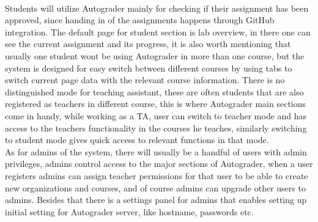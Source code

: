 \\Students will utilize Autograder mainly for checking if their assignment has been approved, since handing in of the assignments happens through GitHub integration. The default page for student section is lab overview, in there one can see the current assignment and its progress, it is also worth mentioning that usually one student wont be using Autograder in more than one course, but the system is designed for easy switch between different courses by using tabs to switch current page data with the relevant course information. There is no distinguished mode for teaching assistant, these are often students that are also registered as teachers in different course, this is where Autograder main sections come in handy, while working as a TA, user can switch to teacher mode and has access to the teachers functionality in the courses he teaches, similarly switching to student mode gives quick access to relevant functions in that mode.
\\As for admins of the system, there will usually be a handful of users with admin privileges, admins control access to the major sections of Autograder, when a user registers admins can assign teacher permissions for that user to be able to create new organizations and courses, and of course admins can upgrade other users to admins. Besides that there is a settings panel for admins that enables setting up initial setting for Autograder server, like hostname, passwords etc.

